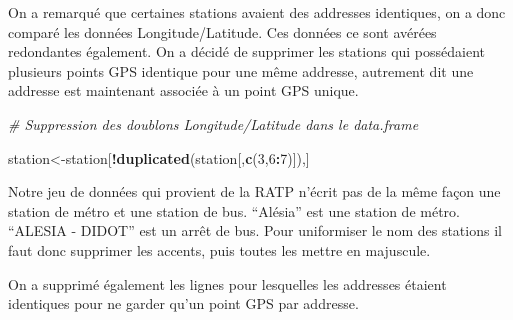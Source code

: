 \documentclass[french,]{article}
\newenvironment{Shaded}{\begin{snugshade}}{\end{snugshade}}
\newcommand{\CommentTok}[1]{\textcolor[rgb]{0.56,0.35,0.01}{\textit{#1}}}
\newcommand{\ControlFlowTok}[1]{\textcolor[rgb]{0.13,0.29,0.53}{\textbf{#1}}}
\newcommand{\DataTypeTok}[1]{\textcolor[rgb]{0.13,0.29,0.53}{#1}}
\newcommand{\DecValTok}[1]{\textcolor[rgb]{0.00,0.00,0.81}{#1}}
\newcommand{\KeywordTok}[1]{\textcolor[rgb]{0.13,0.29,0.53}{\textbf{#1}}}
\newcommand{\NormalTok}[1]{#1}
\newcommand{\OperatorTok}[1]{\textcolor[rgb]{0.81,0.36,0.00}{\textbf{#1}}}
\newcommand{\StringTok}[1]{\textcolor[rgb]{0.31,0.60,0.02}{#1}}
\begin{document}
On a remarqué que certaines stations avaient des addresses identiques,
on a donc comparé les données Longitude/Latitude. Ces données ce sont
avérées redondantes également. On a décidé de supprimer les stations qui
possédaient plusieurs points GPS identique pour une même addresse,
autrement dit une addresse est maintenant associée à un point GPS
unique.

\begin{Shaded}
\begin{Highlighting}[]
\CommentTok{# Suppression des doublons Longitude/Latitude dans le data.frame}

\NormalTok{station<-station[}\OperatorTok{!}\KeywordTok{duplicated}\NormalTok{(station[,}\KeywordTok{c}\NormalTok{(}\DecValTok{3}\NormalTok{,}\DecValTok{6}\OperatorTok{:}\DecValTok{7}\NormalTok{)]),]}
\end{Highlighting}
\end{Shaded}

Notre jeu de données qui provient de la RATP n'écrit pas de la même
façon une station de métro et une station de bus. ``Alésia'' est une
station de métro. ``ALESIA - DIDOT'' est un arrêt de bus. Pour
uniformiser le nom des stations il faut donc supprimer les accents, puis
toutes les mettre en majuscule.

\begin{Shaded}
\end{Shaded}

On a supprimé également les lignes pour lesquelles les addresses étaient
identiques pour ne garder qu'un point GPS par addresse.
\end{document}
